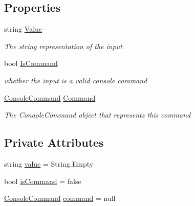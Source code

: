 \subsection*{Properties}
\begin{DoxyCompactItemize}
\item 
string \hyperlink{class_c_p_u___o_s___simulator_1_1_console_1_1_console_input_a2ad81ef96300694cbfe63aa02d098bf2}{Value}
\begin{DoxyCompactList}\small\item\em The string representation of the input \end{DoxyCompactList}\item 
bool \hyperlink{class_c_p_u___o_s___simulator_1_1_console_1_1_console_input_a41ebc5e7f419f80fe60ee45e54492d7e}{Is\+Command}
\begin{DoxyCompactList}\small\item\em whether the input is a valid console command \end{DoxyCompactList}\item 
\hyperlink{class_c_p_u___o_s___simulator_1_1_console_1_1_console_command}{Console\+Command} \hyperlink{class_c_p_u___o_s___simulator_1_1_console_1_1_console_input_a86a4918cd4a894e9af4fd6a5eced98ea}{Command}
\begin{DoxyCompactList}\small\item\em The Conaole\+Command object that represents this command \end{DoxyCompactList}\end{DoxyCompactItemize}
\subsection*{Private Attributes}
\begin{DoxyCompactItemize}
\item 
string \hyperlink{class_c_p_u___o_s___simulator_1_1_console_1_1_console_input_a859295836e526e9b8b5e3da265caa177}{value} = String.\+Empty
\item 
bool \hyperlink{class_c_p_u___o_s___simulator_1_1_console_1_1_console_input_a56609a7b8e3d6bda9e166198e3a176c0}{is\+Command} = false
\item 
\hyperlink{class_c_p_u___o_s___simulator_1_1_console_1_1_console_command}{Console\+Command} \hyperlink{class_c_p_u___o_s___simulator_1_1_console_1_1_console_input_afb0447ccf1317612da0230afe6445d3e}{command} = null
\end{DoxyCompactItemize}


